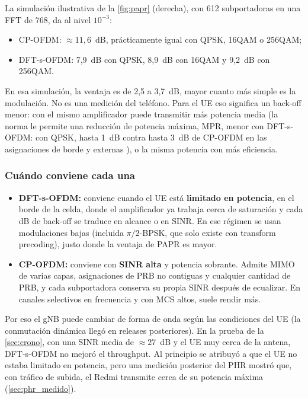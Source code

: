 La simulación ilustrativa de la \cref{fig:papr} (derecha), con 612 subportadoras en una FFT de 768, da al nivel $10^{-3}$:
\begin{itemize}
  \item CP-OFDM: $\approx 11{,}6$~dB, prácticamente igual con QPSK, 16QAM o 256QAM;
  \item DFT-s-OFDM: 7,9~dB con QPSK, 8,9~dB con 16QAM y 9,2~dB con 256QAM.
\end{itemize}
En esa simulación, la ventaja es de 2,5 a 3,7~dB, mayor cuanto más simple es la modulación. No es una medición del teléfono. Para el UE eso significa un back-off menor: con el mismo amplificador puede transmitir más potencia media (la norma le permite una reducción de potencia máxima, MPR, menor con DFT-s-OFDM: con QPSK, hasta 1~dB contra hasta 3~dB de CP-OFDM en las asignaciones de borde y externas \cite[§6.2.2, tabla~6.2.2-1]{ts38101}), o la misma potencia con más eficiencia.

\subsubsection{Cuándo conviene cada una}
\begin{itemize}
  \item \textbf{DFT-s-OFDM:} conviene cuando el UE está \textbf{limitado en potencia}, en el borde de la celda, donde el amplificador ya trabaja cerca de saturación y cada dB de back-off se traduce en alcance o en SINR. En ese régimen se usan modulaciones bajas (incluida $\pi/2$-BPSK, que solo existe con transform precoding), justo donde la ventaja de PAPR es mayor.
  \item \textbf{CP-OFDM:} conviene con \textbf{SINR alta} y potencia sobrante. Admite MIMO de varias capas, asignaciones de PRB no contiguas y cualquier cantidad de PRB, y cada subportadora conserva su propia SINR después de ecualizar. En canales selectivos en frecuencia y con MCS altos, suele rendir más.
\end{itemize}
Por eso el gNB puede cambiar de forma de onda según las condiciones del UE (la conmutación dinámica llegó en releases posteriores). En la prueba de la \cref{sec:crono}, con una SINR media de $\approx 27$~dB y el UE muy cerca de la antena, DFT-s-OFDM no mejoró el throughput. Al principio se atribuyó a que el UE no estaba limitado en potencia, pero una medición posterior del PHR mostró que, con tráfico de subida, el Redmi transmite cerca de su potencia máxima (\cref{sec:phr_medido}).

